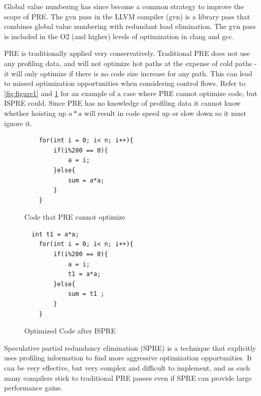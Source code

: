 \documentclass[sigplan,screen]{acmart}
\begin{document}
    Global value numbering has since become a common strategy to improve the scope of PRE. The gvn pass in the LLVM compiler (gvn) is a library pass that combines global value numbering with redundant load elimination. The gvn pass is included in the O2 (and higher) levels of optimization in clang and gcc.

    PRE is traditionally applied very conservatively. Traditional PRE does not use any profiling data, and will not optimize hot paths at the expense of cold paths - it will only optimize if there is no code size increase for any path. This can lead to missed optimization opportunities when considering control flows. Refer to \ref{fig:figure1} and \ref{fig:figure2} for an example of a case where PRE cannot optimize code, but ISPRE could. Since PRE has no knowledge of profiling data it cannot know whether hoisting up \(a*a\) will result in code speed up or slow down so it must ignore it.
    
    \begin{figure}[ht]
    \begin{minipage}[b]{0.45\linewidth}
    \centering
    \begin{small}
    \begin{verbatim}
    for(int i = 0; i< n; i++){
        if(i%200 == 0){
            a = i;
        }else{
            sum = a*a;
        }
    }
    \end{verbatim}
    \end{small}
    \caption{Code that PRE cannot optimize}
    \label{fig:figure1}
    \end{minipage}
    \hspace{0.5cm}
    \begin{minipage}[b]{0.45\linewidth}
    \centering
    \begin{small}
    \begin{verbatim}
  int t1 = a*a;
    for(int i = 0; i< n; i++){
        if(i%200 == 0){
            a = i;
            t1 = a*a;
        }else{
            sum = t1 ;
        }
    }
    \end{verbatim}
    \end{small}
    \caption{Optimized Code after ISPRE}
    \label{fig:figure2}
    \end{minipage}
    \end{figure}

    Speculative partial redundancy elimination (SPRE) is a technique that explicitly uses profiling information to find more aggressive optimization opportunities. It can be very effective, but very complex and difficult to implement, and as such many compilers stick to traditional PRE passes even if SPRE can provide large performance gains.
\end{document}
